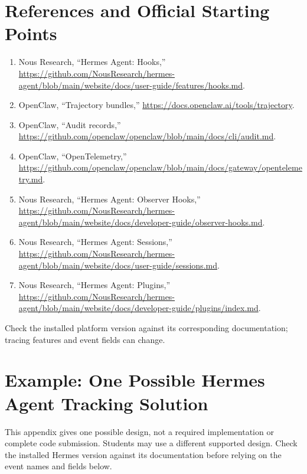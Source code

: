 \documentclass[11pt]{article}
\begin{document}
\section{References and Official Starting Points}\label{sec:sources}
\begin{enumerate}
  \item Nous Research, ``Hermes Agent: Hooks,'' \url{https://github.com/NousResearch/hermes-agent/blob/main/website/docs/user-guide/features/hooks.md}.
  \item OpenClaw, ``Trajectory bundles,'' \url{https://docs.openclaw.ai/tools/trajectory}.
  \item OpenClaw, ``Audit records,'' \url{https://github.com/openclaw/openclaw/blob/main/docs/cli/audit.md}.
  \item OpenClaw, ``OpenTelemetry,'' \url{https://github.com/openclaw/openclaw/blob/main/docs/gateway/opentelemetry.md}.
  \item Nous Research, ``Hermes Agent: Observer Hooks,'' \url{https://github.com/NousResearch/hermes-agent/blob/main/website/docs/developer-guide/observer-hooks.md}.
  \item Nous Research, ``Hermes Agent: Sessions,'' \url{https://github.com/NousResearch/hermes-agent/blob/main/website/docs/user-guide/sessions.md}.
  \item Nous Research, ``Hermes Agent: Plugins,'' \url{https://github.com/NousResearch/hermes-agent/blob/main/website/docs/developer-guide/plugins/index.md}.
\end{enumerate}
Check the installed platform version against its corresponding documentation; tracing features and event fields can change.

\appendix
\section{Example: One Possible Hermes Agent Tracking Solution}
This appendix gives one possible design, not a required implementation or complete code submission. Students may use a different supported design. Check the installed Hermes version against its documentation before relying on the event names and fields below.
\end{document}
